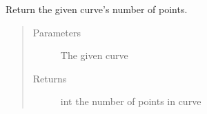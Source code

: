 \documentclass[letterpaper,10pt,english]{sphinxmanual}
\begin{document}
\begin{fulllineitems}
\label{\detokenize{pydv:pydvpy.getnumpoints}}
Return the given curve’s number of points.
\begin{quote}\begin{description}
\item[{Parameters}] \leavevmode
{} \textendash{} The given curve

\item[{Returns}] \leavevmode
int \textendash{} the number of points in curve

\end{description}\end{quote}

\end{fulllineitems}

\end{document}
